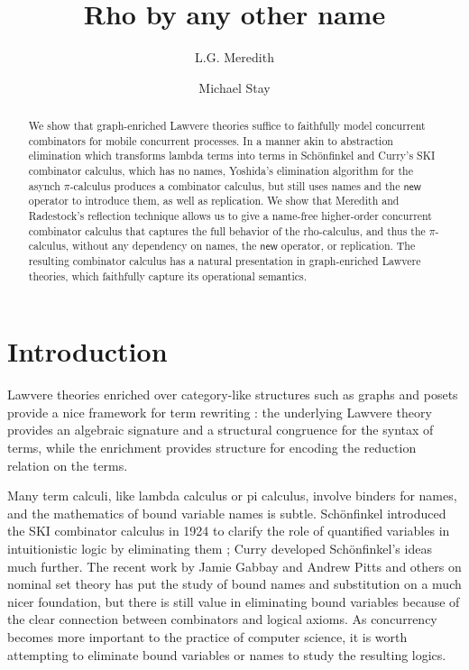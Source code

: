 \documentclass{llncs}
\title{Rho by any other name}
\author{
L.G. Meredith\inst{1}\\
\and
Michael Stay\inst{2}\\
}
\institute{
  {RChain Cooperative}\\
  \email{\fontsize{8}{8}\selectfont greg@rchain.coop}
  \and
  {Pyrofex Corp.}\\
  \email{\fontsize{8}{8}\selectfont stay@pyrofex.net}\\
}
\newcommand{\new}{\mathsf{new}}
\newcommand{\pic}{$\pi$-calculus}
\begin{document}
\maketitle
\begin{abstract}
\noindent
  We show that graph-enriched Lawvere theories suffice to faithfully
  model concurrent combinators for mobile concurrent processes. In a
  manner akin to abstraction elimination which transforms lambda terms
  into terms in Schönfinkel and Curry's SKI combinator calculus, which
  has no names, Yoshida's elimination algorithm for the asynch \pic
  produces a combinator calculus,
  but still uses names and the $\new$ operator to introduce
  them, as well as replication.  We show that Meredith and Radestock's
  reflection technique allows
  us to give a name-free higher-order concurrent combinator calculus
  that captures the full behavior of the rho-calculus, and thus the
  \pic, without any dependency on names, the $\new$ operator,
  or replication. The resulting combinator calculus has a natural
  presentation in graph-enriched Lawvere theories, which faithfully
  capture its operational semantics.

\end{abstract}

\section{Introduction}
  
Lawvere theories enriched over category-like structures such as graphs
and posets provide a nice framework for term rewriting
\cite{GhaniLuth}: the underlying Lawvere theory provides an algebraic
signature and a structural congruence for the syntax of terms, while
the enrichment provides structure for encoding the reduction relation
on the terms.

Many term calculi, like lambda calculus or pi calculus, involve
binders for names, and the mathematics of bound variable names is
subtle.  Sch\"onfinkel introduced the SKI combinator calculus in 1924
to clarify the role of quantified variables in intuitionistic logic by
eliminating them \cite{finkel}; Curry developed Sch\"onfinkel's ideas
much further.  The recent work by Jamie Gabbay and Andrew Pitts
\cite{DBLP:journals/fac/GabbayP02} and others
\cite{DBLP:journals/jcss/Clouston14} on nominal set theory has put the
study of bound names and substitution on a much nicer foundation, but
there is still value in eliminating bound variables because of the
clear connection between combinators and logical axioms.  As
concurrency becomes more important to the practice of computer
science, it is worth attempting to eliminate bound variables or names
to study the resulting logics.
\end{document}
